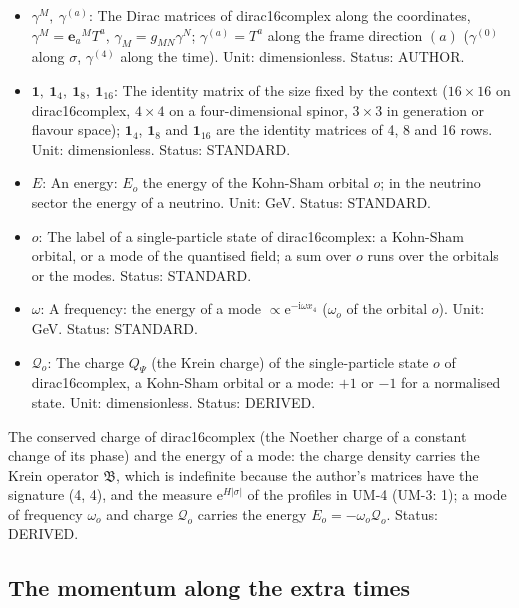 \documentclass[
  10pt,
]{article}
\begin{document}
\begin{itemize}
  is real and antisymmetric. Unit: dimensionless. Status: AUTHOR.
\item
  \(\gamma^M,\ \gamma^{(a)}\): The Dirac matrices of dirac16complex
  along the coordinates, \(\gamma^M = \mathbf{e}_a{}^MT^a\),
  \(\gamma_M = g_{MN}\gamma^N\); \(\gamma^{(a)} = T^a\) along the frame
  direction \((a)\) (\(\gamma^{(0)}\) along \(\sigma\), \(\gamma^{(4)}\)
  along the time). Unit: dimensionless. Status: AUTHOR.
\item
  \(\mathbf{1},\ \mathbf{1}_4,\ \mathbf{1}_8,\ \mathbf{1}_{16}\): The
  identity matrix of the size fixed by the context (\(16 \times 16\) on
  dirac16complex, \(4 \times 4\) on a four-dimensional spinor,
  \(3 \times 3\) in generation or flavour space); \(\mathbf{1}_4\),
  \(\mathbf{1}_8\) and \(\mathbf{1}_{16}\) are the identity matrices of
  4, 8 and 16 rows. Unit: dimensionless. Status: STANDARD.
\item
  \(E\): An energy: \(E_o\) the energy of the Kohn-Sham orbital \(o\);
  in the neutrino sector the energy of a neutrino. Unit: GeV. Status:
  STANDARD.
\item
  \(o\): The label of a single-particle state of dirac16complex: a
  Kohn-Sham orbital, or a mode of the quantised field; a sum over \(o\)
  runs over the orbitals or the modes. Status: STANDARD.
\item
  \(\omega\): A frequency: the energy of a mode
  \(\propto \mathrm{e}^{-\mathrm{i}\omega x_4}\) (\(\omega_o\) of the
  orbital \(o\)). Unit: GeV. Status: STANDARD.
\item
  \(\mathcal{Q}_o\): The charge \(Q_\Psi\) (the Krein charge) of the
  single-particle state \(o\) of dirac16complex, a Kohn-Sham orbital or
  a mode: \(+1\) or \(-1\) for a normalised state. Unit: dimensionless.
  Status: DERIVED.
\end{itemize}

The conserved charge of dirac16complex (the Noether charge of a constant
change of its phase) and the energy of a mode: the charge density
carries the Krein operator \(\mathfrak{B}\), which is indefinite because
the author's matrices have the signature (4, 4), and the measure
\(\mathrm{e}^{H\lvert\sigma\rvert}\) of the profiles in UM-4 (UM-3: 1);
a mode of frequency \(\omega_o\) and charge \(\mathcal{Q}_o\) carries
the energy \(E_o = -\omega_o\mathcal{Q}_o\). Status: DERIVED.

\hypertarget{the-momentum-along-the-extra-times}{%
\subsection{The momentum along the extra
times}\label{the-momentum-along-the-extra-times}}
\end{document}
